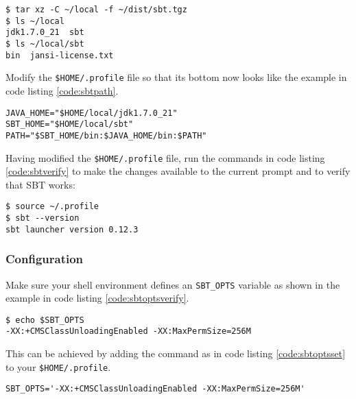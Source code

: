 \begin{lstlisting}[label=code:sbtunpack,caption=Unpacking the tarball to the \texttt{local} directory and checking its contents]
$ tar xz -C ~/local -f ~/dist/sbt.tgz 
$ ls ~/local
jdk1.7.0_21  sbt
$ ls ~/local/sbt
bin  jansi-license.txt
\end{lstlisting}

Modify the \texttt{\$HOME/.profile} file so that its bottom now looks
like the example in code listing \ref{code:sbtpath}.

\begin{lstlisting}[label=code:sbtpath,caption=Code to add to the bottom of the \texttt{.profile} file]
JAVA_HOME="$HOME/local/jdk1.7.0_21"
SBT_HOME="$HOME/local/sbt"
PATH="$SBT_HOME/bin:$JAVA_HOME/bin:$PATH"
\end{lstlisting}

Having modified the \texttt{\$HOME/.profile} file, run the commands in
code listing \ref{code:sbtverify} to make the changes available to the
current prompt and to verify that \ac{SBT} works:

\begin{lstlisting}[label=code:sbtverify,caption=Sourcing the \texttt{.profile} file and verifying SBT works]
$ source ~/.profile
$ sbt --version
sbt launcher version 0.12.3
\end{lstlisting}

\subsubsection{Configuration}

Make sure your shell environment defines an \texttt{SBT\_OPTS} variable
as shown in the example in code listing \ref{code:sbtoptsverify}.

\begin{lstlisting}[label=code:sbtoptsverify,caption=Verifying SBT options]
$ echo $SBT_OPTS                                                               
-XX:+CMSClassUnloadingEnabled -XX:MaxPermSize=256M
\end{lstlisting}

This can be achieved by adding the command as in code listing
\ref{code:sbtoptsset} to your \texttt{\$HOME/.profile}.

\begin{lstlisting}[label=code:sbtoptsset,caption=Setting SBT options in the \texttt{.profile} file]
SBT_OPTS='-XX:+CMSClassUnloadingEnabled -XX:MaxPermSize=256M'
\end{lstlisting}

